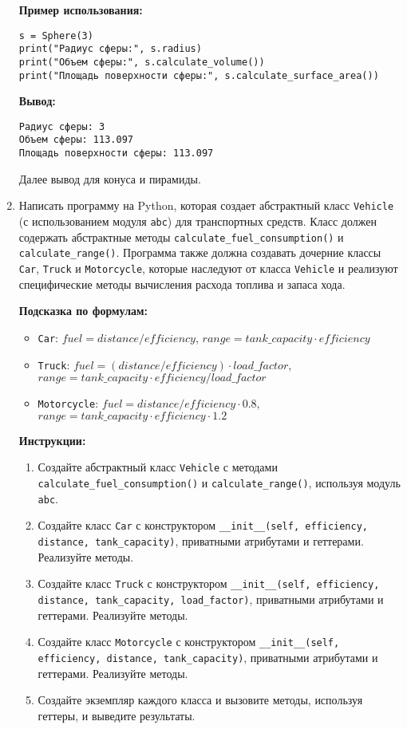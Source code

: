 \begin{enumerate}
\textbf{Пример использования:}
\begin{verbatim}
s = Sphere(3)
print("Радиус сферы:", s.radius)
print("Объем сферы:", s.calculate_volume())
print("Площадь поверхности сферы:", s.calculate_surface_area())
\end{verbatim}

\textbf{Вывод:}
\begin{verbatim}
Радиус сферы: 3
Объем сферы: 113.097
Площадь поверхности сферы: 113.097
\end{verbatim}

Далее вывод для конуса и пирамиды.

\item
Написать программу на Python, которая создает абстрактный класс \texttt{Vehicle} (с использованием модуля \texttt{abc}) для транспортных средств. 
Класс должен содержать абстрактные методы \texttt{calculate\_fuel\_consumption()} и \texttt{calculate\_range()}. 
Программа также должна создавать дочерние классы \texttt{Car}, \texttt{Truck} и \texttt{Motorcycle}, 
которые наследуют от класса \texttt{Vehicle} и реализуют специфические методы вычисления расхода топлива и запаса хода.

\textbf{Подсказка по формулам:}
\begin{itemize}
    \item \texttt{Car}: $fuel = distance / efficiency$, $range = tank\_capacity \cdot efficiency$
    \item \texttt{Truck}: $fuel = (distance / efficiency) \cdot load\_factor$, $range = tank\_capacity \cdot efficiency / load\_factor$
    \item \texttt{Motorcycle}: $fuel = distance / efficiency \cdot 0.8$, $range = tank\_capacity \cdot efficiency \cdot 1.2$
\end{itemize}

\textbf{Инструкции:}
\begin{enumerate}
    \item Создайте абстрактный класс \texttt{Vehicle} с методами \texttt{calculate\_fuel\_consumption()} и \texttt{calculate\_range()}, используя модуль \texttt{abc}.
    \item Создайте класс \texttt{Car} с конструктором \texttt{\_\_init\_\_(self, efficiency, distance, tank\_capacity)}, приватными атрибутами и геттерами. Реализуйте методы.
    \item Создайте класс \texttt{Truck} с конструктором \texttt{\_\_init\_\_(self, efficiency, distance, tank\_capacity, load\_factor)}, приватными атрибутами и геттерами. Реализуйте методы.
    \item Создайте класс \texttt{Motorcycle} с конструктором \texttt{\_\_init\_\_(self, efficiency, distance, tank\_capacity)}, приватными атрибутами и геттерами. Реализуйте методы.
    \item Создайте экземпляр каждого класса и вызовите методы, используя геттеры, и выведите результаты.
\end{enumerate}


\end{enumerate}
